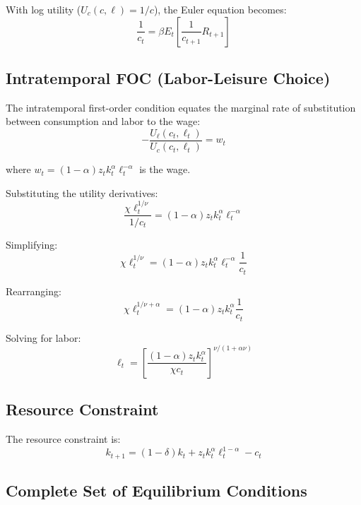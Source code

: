 \documentclass[11pt]{article}
\theoremstyle{definition}
\begin{document}
With log utility ($U_c(c, \ell) = 1/c$), the Euler equation becomes:
\begin{equation}
\frac{1}{c_t} = \beta E_t \left[ \frac{1}{c_{t+1}} R_{t+1} \right]
\end{equation}

\subsection{Intratemporal FOC (Labor-Leisure Choice)}

The intratemporal first-order condition equates the marginal rate of substitution between consumption and labor to the wage:
\begin{equation}
-\frac{U_{\ell}(c_t, \ell_t)}{U_c(c_t, \ell_t)} = w_t
\end{equation}

where $w_t = (1-\alpha) z_t k_t^{\alpha} \ell_t^{-\alpha}$ is the wage.

Substituting the utility derivatives:
\begin{equation}
\frac{\chi \ell_t^{1/\nu}}{1/c_t} = (1-\alpha) z_t k_t^{\alpha} \ell_t^{-\alpha}
\end{equation}

Simplifying:
\begin{equation}
\chi \ell_t^{1/\nu} = (1-\alpha) z_t k_t^{\alpha} \ell_t^{-\alpha} \frac{1}{c_t}
\end{equation}

Rearranging:
\begin{equation}
\chi \ell_t^{1/\nu + \alpha} = (1-\alpha) z_t k_t^{\alpha} \frac{1}{c_t}
\end{equation}

Solving for labor:
\begin{equation}
\ell_t = \left[ \frac{(1-\alpha) z_t k_t^{\alpha}}{\chi c_t} \right]^{\nu/(1 + \alpha\nu)}
\end{equation}

\subsection{Resource Constraint}

The resource constraint is:
\begin{equation}
k_{t+1} = (1-\delta) k_t + z_t k_t^{\alpha} \ell_t^{1-\alpha} - c_t
\end{equation}

\subsection{Complete Set of Equilibrium Conditions}
\end{document}
